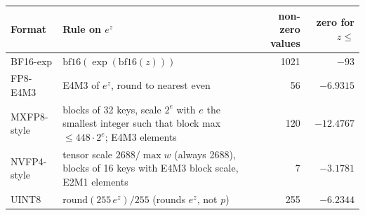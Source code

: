 \begin{tabular}{@{}lp{7.0cm}rr@{}}
\toprule
Format & Rule on $e^z$ & non-zero values & zero for $z\le$ \\
\midrule
BF16-exp & $\mathrm{bf16}(\exp(\mathrm{bf16}(z)))$ & 1021 & $-93$ \\
FP8-E4M3 & E4M3 of $e^z$, round to nearest even & 56 & $-6.9315$ \\
MXFP8-style & blocks of 32 keys, scale $2^{e}$ with $e$ the smallest integer such that block max $\le 448\cdot2^{e}$; E4M3 elements & 120 & $-12.4767$ \\
NVFP4-style & tensor scale $2688/\max w$ (always 2688), blocks of 16 keys with E4M3 block scale, E2M1 elements & 7 & $-3.1781$ \\
UINT8 & $\mathrm{round}(255\,e^z)/255$ (rounds $e^z$, not $p$) & 255 & $-6.2344$ \\
\bottomrule
\end{tabular}

